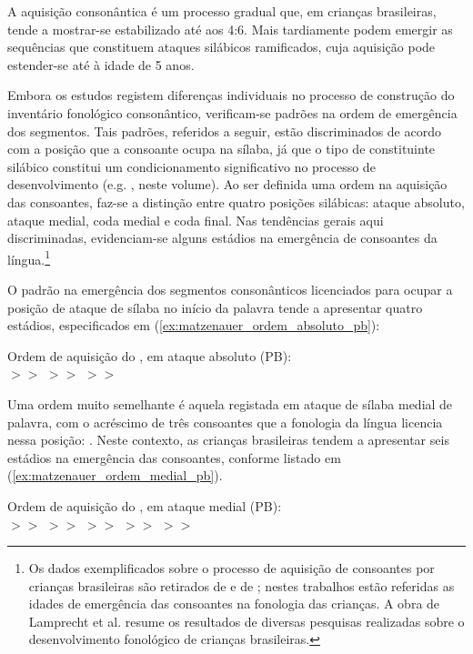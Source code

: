 \documentclass[output=paper]{LSP/langsci}
\begin{document}
A aquisição consonântica é um processo gradual que, em crianças brasileiras, tende a mostrar-se estabilizado até aos 4:6. Mais tardiamente podem emergir as sequências que constituem ataques silábicos ramificados, cuja aquisição pode estender-se até à idade de 5 anos.

Embora os estudos registem diferenças individuais no processo de construção do inventário fonológico consonântico, verificam-se padrões na ordem de emergência dos segmentos. Tais padrões, referidos a seguir, estão discriminados de acordo com a posição que a consoante ocupa na sílaba, já que o tipo de constituinte silábico constitui um condicionamento significativo no processo de desenvolvimento (e.g. \citealt{freitas2017}, neste volume). Ao ser definida uma ordem na aquisição das consoantes, faz-se a distinção entre quatro posições silábicas: ataque absoluto, ataque medial, coda medial e coda final. Nas tendências gerais aqui discriminadas, evidenciam-se alguns estádios na emergência de consoantes da língua.\footnote{Os dados exemplificados sobre o processo de aquisição de consoantes por crianças brasileiras são retirados de \citet{matzenauer1990} e de \citet{lamprecht_etal2004}; nestes trabalhos estão referidas as idades de emergência das consoantes na fonologia das crianças. A obra de Lamprecht et al. resume os resultados de diversas pesquisas realizadas sobre o desenvolvimento fonológico de crianças brasileiras.}

O padrão na emergência dos segmentos consonânticos licenciados para ocupar a posição de ataque de sílaba no início da palavra tende a apresentar quatro estádios, especificados em (\ref{ex:matzenauer_ordem_absoluto_pb}):

\begin{exe}
\ex\label{ex:matzenauer_ordem_absoluto_pb} Ordem de aquisição do , em ataque absoluto (PB):\\ $>>$  $>>$  $>>$ 
\end{exe}

Uma ordem muito semelhante é aquela registada em ataque de sílaba medial de palavra, com o acréscimo de três consoantes que a fonologia da língua licencia nessa posição: . Neste contexto, as crianças brasileiras tendem a apresentar seis estádios na
emergência das consoantes, conforme listado em (\ref{ex:matzenauer_ordem_medial_pb}).

\begin{exe}
\ex\label{ex:matzenauer_ordem_medial_pb} Ordem de aquisição do , em ataque medial (PB):\\ $>>$  $>>$  $>>$  $>>$  $>>$ 
\end{exe}
\end{document}
